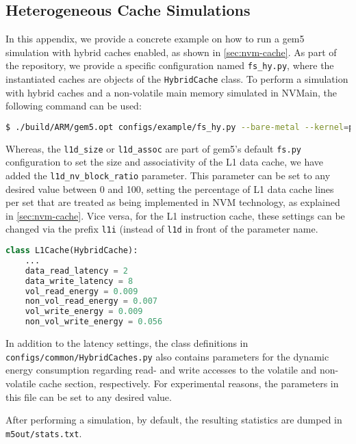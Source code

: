 \subsection*{Heterogeneous Cache Simulations}\label{app:fau}
In this appendix, we provide a concrete example on how to run a gem5 simulation with hybrid caches enabled, as shown in \cref{sec:nvm-cache}.
As part of the repository, we provide a specific configuration named \texttt{fs\_hy.py}, where the instantiated caches are objects of the \texttt{HybridCache} class.
To perform a simulation with hybrid caches and a non-volatile main memory simulated in NVMain, the following command can be used:
\begin{lstlisting}[language=bash]
$ ./build/ARM/gem5.opt configs/example/fs_hy.py --bare-metal --kernel=path_to_unikraft_kernel --cpu-type=O3CPU --sys-clock=240MHz --cpu-clock=480MHz --machine-type=VExpress_GEM5_V2 --dtb-filename=system/arm/dt/armv8_gem5_v2_1cpu.dtb --mem-size=4GB --mem-type=NVMainMemory --nvmain-config=../nvmain/Config/PCM_ISSCC_2012_4GB.config --caches --l1d_size=32kB --l1i_size=32kB --l1d_assoc=4 --l1i_assoc=2 --l1d_nv_block_ratio=50
\end{lstlisting}
Whereas, the \texttt{l1d\_size} or \texttt{l1d\_assoc} are part of gem5's default \texttt{fs.py} configuration to set the size and associativity of the L1 data cache, we have added the \texttt{l1d\_nv\_block\_ratio} parameter.
This parameter can be set to any desired value between 0 and 100, setting the percentage of L1 data cache lines per set that are treated as being implemented in NVM technology, as explained in \cref{sec:nvm-cache}.
Vice versa, for the L1 instruction cache, these settings can be changed via the prefix \texttt{l1i} (instead of \texttt{l1d} in front of the parameter name.
\begin{lstlisting}[language=Python]
class L1Cache(HybridCache):
    ...
    data_read_latency = 2
    data_write_latency = 8
    vol_read_energy = 0.009
    non_vol_read_energy = 0.007
    vol_write_energy = 0.009
    non_vol_write_energy = 0.056
\end{lstlisting}
In addition to the latency settings, the class definitions in \texttt{configs/common/HybridCaches.py} also contains parameters for the dynamic energy consumption regarding read- and write accesses to the volatile and non-volatile cache section, respectively.
For experimental reasons, the parameters in this file can be set to any desired value.
\par
After performing a simulation, by default, the resulting statistics are dumped in \texttt{m5out/stats.txt}.
